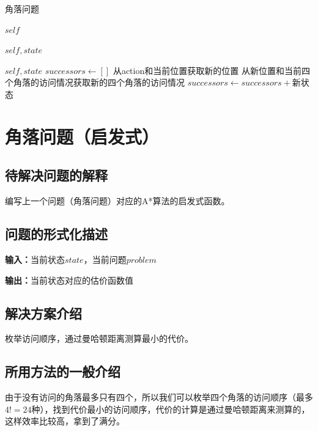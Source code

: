 \documentclass[forprint]{WHUBachelor}
\begin{document}
\begin{algorithm}[H]
  \caption{角落问题}
  \begin{algorithmic}[1] %
     {$self$}
    \State {}
    \EndFunction

     {$self, state$}
    \State {}
    \Else
    \State {}
    \EndIf
    \EndFunction

     {$self, state$}
    \State $successors \gets []$
    \State 从action和当前位置获取新的位置
    \State 从新位置和当前四个角落的访问情况获取新的四个角落的访问情况
    \State $successors \gets successors + $新状态
    \EndIf
    \EndFor
    \State {}
    \EndFunction
  \end{algorithmic}
\end{algorithm}

\section{角落问题（启发式）}

\subsection{待解决问题的解释}

编写上一个问题（角落问题）对应的A*算法的启发式函数。

\subsection{问题的形式化描述}

\textbf{输入：}当前状态$state$，当前问题$problem$

\textbf{输出：}当前状态对应的估价函数值

\subsection{解决方案介绍}

枚举访问顺序，通过曼哈顿距离测算最小的代价。

\subsection{所用方法的一般介绍}

由于没有访问的角落最多只有四个，所以我们可以枚举四个角落的访问顺序（最多$4!=24$种），找到代价最小的访问顺序，代价的计算是通过曼哈顿距离来测算的，这样效率比较高，拿到了满分。
\end{document}
